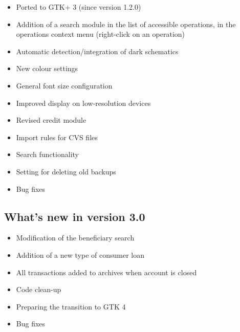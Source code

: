 \begin{itemize}
	\item Ported to \gls{GTK}+ 3 (since version 1.2.0)%
	\item Addition of a search module in the list of accessible operations, in the operations context menu (right-click on an operation)%
	\item Automatic detection/integration of dark schematics%
	\item New colour settings%
	\item General font size configuration%
	\item Improved display on low-resolution devices%
	\item Revised credit module%
	\item Import rules for \gls{CVS} files%
	\item Search functionality%
	\item Setting for deleting old backups%
	\item Bug fixes%
\end{itemize}

\subsection{What's new in version 3.0}

\begin{itemize}
	\item Modification of the beneficiary search%
	\item Addition of a new type of consumer loan%
	\item All transactions added to archives when account is closed%
	\item Code clean-up%
	\item Preparing the transition to \gls{GTK} 4%
	\item Bug fixes%
\end{itemize}

